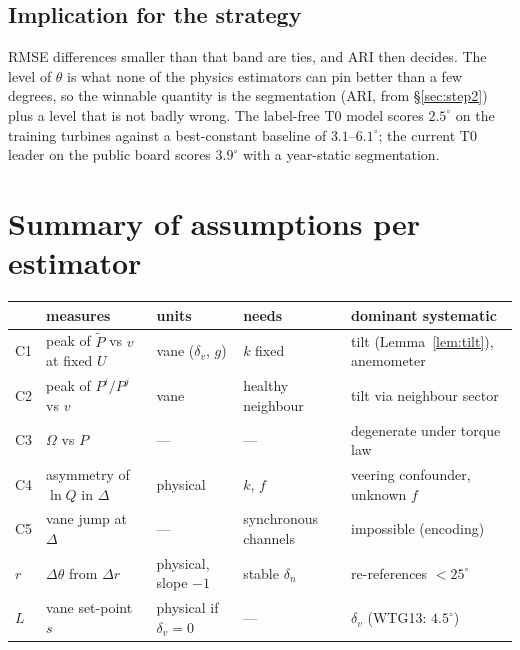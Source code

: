\documentclass[11pt,a4paper]{article}
\theoremstyle{remark}
\newcommand{\dg}{^{\circ}}
\begin{document}
\subsection{Implication for the strategy}
RMSE differences smaller than that band are ties, and ARI then decides. The
level of $\theta$ is what none of the physics estimators can pin better than a
few degrees, so the winnable quantity is the segmentation (ARI, from
\S\ref{sec:step2}) plus a level that is not badly wrong. The label-free T0 model
scores $2.5\dg$ on the training turbines against a best-constant baseline of
$3.1$--$6.1\dg$; the current T0 leader on the public board scores $3.9\dg$ with a
year-static segmentation.

\section{Summary of assumptions per estimator}\label{sec:summary}
\begin{center}\small
\begin{tabular}{@{}lp{3.6cm}p{2.6cm}p{2.4cm}p{4.2cm}@{}}
\toprule
 & measures & units & needs & dominant systematic \\
\midrule
C1 & peak of $\tilde P$ vs $v$ at fixed $U$ & vane ($\delta_v$, $g$) & $k$ fixed & tilt (Lemma~\ref{lem:tilt}), anemometer \\
C2 & peak of $P^i/P^j$ vs $v$ & vane & healthy neighbour & tilt via neighbour sector \\
C3 & $\Omega$ vs $P$ & --- & --- & degenerate under torque law \\
C4 & asymmetry of $\ln Q$ in $\Delta$ & physical & $k$, $f$ & veering confounder, unknown $f$ \\
C5 & vane jump at $\Delta$ & --- & synchronous channels & impossible (encoding) \\
$r$ & $\Delta\theta$ from $\Delta r$ & physical, slope $-1$ & stable $\delta_n$ & re-references $<25\dg$ \\
$L$ & vane set-point $s$ & physical if $\delta_v=0$ & --- & $\delta_v$ (WTG13: $4.5\dg$) \\
\bottomrule
\end{tabular}
\end{center}
\end{document}
